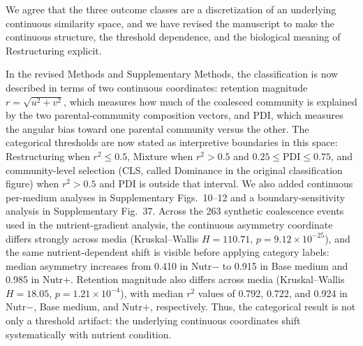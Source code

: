 
\responselabel We agree that the three outcome classes are a discretization of an underlying continuous similarity space, and we have revised the manuscript to make the continuous structure, the threshold dependence, and the biological meaning of Restructuring explicit.

In the revised Methods and Supplementary Methods, the classification is now described in terms of two continuous coordinates: retention magnitude $r = \sqrt{u^2+v^2}$, which measures how much of the coalesced community is explained by the two parental-community composition vectors, and PDI, which measures the angular bias toward one parental community versus the other. The categorical thresholds are now stated as interpretive boundaries in this space: Restructuring when $r^2 \leq 0.5$, Mixture when $r^2 > 0.5$ and $0.25 \leq \mathrm{PDI} \leq 0.75$, and community-level selection (CLS, called Dominance in the original classification figure) when $r^2 > 0.5$ and PDI is outside that interval. We also added continuous per-medium analyses in Supplementary Figs.~10--12 and a boundary-sensitivity analysis in Supplementary Fig.~37. Across the 263 synthetic coalescence events used in the nutrient-gradient analysis, the continuous asymmetry coordinate differs strongly across media (Kruskal--Wallis $H = 110.71$, $p = 9.12 \times 10^{-25}$), and the same nutrient-dependent shift is visible before applying category labels: median asymmetry increases from 0.410 in Nutr$-$ to 0.915 in Base medium and 0.985 in Nutr$+$. Retention magnitude also differs across media (Kruskal--Wallis $H = 18.05$, $p = 1.21 \times 10^{-4}$), with median $r^2$ values of 0.792, 0.722, and 0.924 in Nutr$-$, Base medium, and Nutr$+$, respectively. Thus, the categorical result is not only a threshold artifact: the underlying continuous coordinates shift systematically with nutrient condition.

